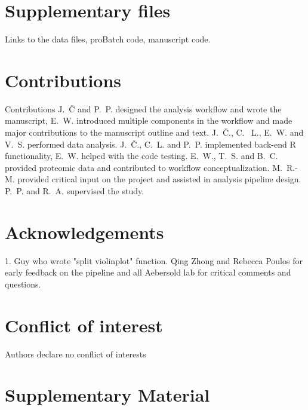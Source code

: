 \documentclass[num-refs]{wiley-article}
\newcommand{\beginsupplement}{%
	\setcounter{table}{0}
	\renewcommand{\thetable}{S\arabic{table}}%
	\setcounter{figure}{0}
	\renewcommand{\thefigure}{S\arabic{figure}}%
}
\begin{document}
\section*{Supplementary files}
Links to the data files, proBatch code, manuscript code.

\section*{Contributions}

Contributions
J.~Č and P.~P. designed the analysis workflow and wrote the manuscript, E.~W. introduced multiple components in the workflow and made major contributions to the manuscript outline and text. J.~Č., C. ~L., E.~W. and V.~S. performed data analysis. J.~Č., C.~L. and P.~P. implemented back-end R functionality, E.~W. helped with the code testing. E.~W., T.~S. and B.~C. provided proteomic data and contributed to workflow conceptualization. M.~R.-M. provided critical input on the project and assisted in analysis pipeline design. P.~P. and R.~A. supervised the study.

\section*{Acknowledgements}
1. Guy who wrote "split violinplot" function. Qing Zhong and Rebecca Poulos for early feedback on the pipeline and all Aebersold lab for critical comments and questions.

\section*{Conflict of interest}
Authors declare no conflict of interests


\printendnotes




\newpage
\section{Supplementary Material}
\beginsupplement
\end{document}
